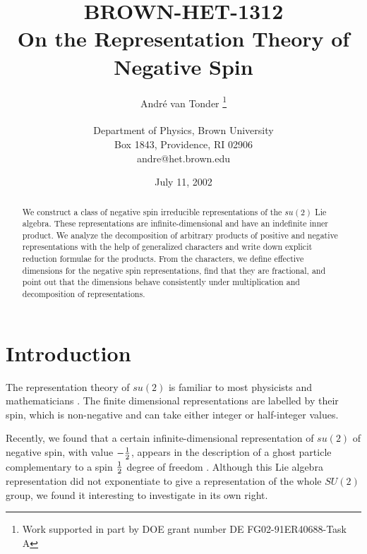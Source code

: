 \documentclass[a4paper,dvips,12pt]{article}
\newcommand {\half} {{1 \over 2}}
\begin{document}
    \title{{\footnotesize{\hfill BROWN-HET-1312}}
            \\On the Representation Theory of Negative Spin}
    \author{Andr\'e van Tonder
            \thanks{Work supported in part by DOE grant number DE FG02-91ER40688-Task A}
            \\ \\
            Department of Physics, Brown University \\
            Box 1843, Providence, RI 02906 \\
            andre@het.brown.edu}
    \date{July 11, 2002}

    \maketitle

    \begin{abstract}
        We construct a class of negative spin irreducible representations
        of the $su(2)$ Lie algebra.  These representations are
        infinite-dimensional and have an indefinite inner product.
        We analyze the decomposition of arbitrary
        products of positive and negative representations with the help of
        generalized characters and write down explicit
        reduction formulae for the products.
        From the characters, we define effective dimensions for
        the negative spin representations, find that they are
        fractional, and point out that the dimensions behave
        consistently under multiplication and decomposition of
        representations.
    \end{abstract}


    \section{Introduction}

    The representation theory of $su(2)$ is
    familiar to most physicists and mathematicians \cite{ELLIOTT}.  The
    finite dimensional representations are labelled by
    their spin, which is non-negative and can take either integer or
    half-integer values.

    Recently, we found that a certain infinite-dimensional
    representation of $su(2)$ of negative spin,
    with value $-\half$, appears in the description of
    a ghost particle
    complementary to a spin $\half$ degree of freedom
    \cite{MYSELF}.
    Although this Lie algebra
    representation did not exponentiate to give a
    representation of the whole $SU(2)$ group, we found it
    interesting to investigate in
    its own right.
\end{document}

